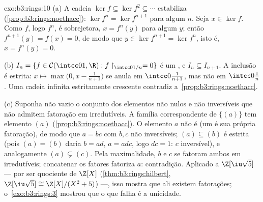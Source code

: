 \begin{solution}{exo:b3:rings:10}
(a) A cadeia $\ker f \subseteq \ker f^2 \subseteq \cdots$ estabiliza (\cref{prop:b3:rings:noethacc}): $\ker f^n = \ker
f^{n+1}$ para algum
$n$. Seja $x \in \ker f$. Como $f$, logo $f^n$, é sobrejetora, $x = f^n(y)$
para algum $y$; então $f^{n+1}(y) = f(x) =
0$, de modo que $y \in \ker f^{n+1} = \ker f^n$, isto é, $x = f^n(y) = 0$.

(b) $I_n = \{f \in \mathcal C(\intcc01, \R) : f\restriction_{
\intcc0{1/n}} = 0\}$ é um , e $I_n \subseteq I_{n+1}$. A inclusão é estrita: $x \mapsto \max\bigl(0, x -
\frac1{n+1}\bigr)$ se anula em
$\intcc0{\frac1{n+1}}$, mas não em $\intcc0{\frac1n}$. Uma cadeia infinita estritamente crescente
contradiz a~\cref{prop:b3:rings:noethacc}.

(c) Suponha não vazio o conjunto dos elementos não nulos e não
inversíveis que não admitem fatoração em irredutíveis. A família
correspondente de  $\{(a)\}$ tem elemento  $(a)$
(\cref{prop:b3:rings:noethacc}). O elemento $a$ não é  (um 
é sua própria fatoração), de modo que $a = bc$ com $b, c$ não
inversíveis; $(a) \subseteq (b)$ é estrita (pois $(a) =
(b)$ daria $b = ad$, $a = adc$, logo
$dc = 1$: $c$ inversível), e analogamente $(a) \subsetneq (c)$. Pela
maximalidade, $b$ e $c$ se fatoram ambos em irredutíveis;
concatenar os fatores fatoriza $a$: contradição. Aplicado a $\Z[\iu\sqrt5]$ ---
 por ser quociente de $\Z[X]$ (\cref{thm:b3:rings:hilbert}, $\Z[\iu\sqrt5]
\cong \Z[X]/(X^2+5)$) ---,
isso mostra que ali existem fatorações; o~\cref{exo:b3:rings:3} mostrou que o
que falha é a unicidade.
\end{solution}

